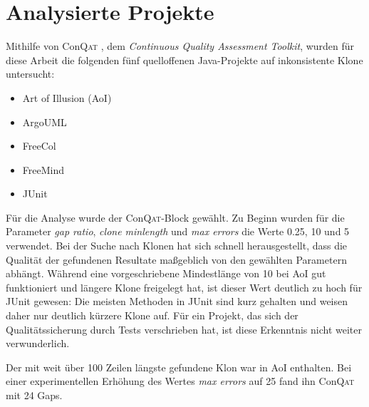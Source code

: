 \section{Analysierte Projekte}

Mithilfe von Con\textsc{Qat} \cite{deissenboeck2008tool}, dem \textit{Continuous Quality Assessment Toolkit}, wurden für diese Arbeit die folgenden fünf quelloffenen Java-Projekte auf inkonsistente Klone untersucht:

\begin{itemize}
  \item Art of Illusion (AoI)
  \item ArgoUML
  \item FreeCol
  \item FreeMind
  \item JUnit
\end{itemize}

Für die Analyse wurde der Con\textsc{Qat}-Block  gewählt. Zu Beginn wurden für die Parameter \textit{gap ratio}, \textit{clone minlength} und \textit{max errors} die Werte 0.25, 10 und 5 verwendet. Bei der Suche nach Klonen hat sich schnell herausgestellt, dass die Qualität der gefundenen Resultate maßgeblich von den gewählten Parametern abhängt. Während eine vorgeschriebene Mindestlänge von 10 bei AoI gut funktioniert und längere Klone freigelegt hat, ist dieser Wert deutlich zu hoch für JUnit gewesen: Die meisten Methoden in JUnit sind kurz gehalten und weisen daher nur deutlich kürzere Klone auf. Für ein Projekt, das sich der Qualitätssicherung durch Tests verschrieben hat, ist diese Erkenntnis nicht weiter verwunderlich.

Der mit weit über 100 Zeilen längste gefundene Klon war in AoI enthalten. Bei einer experimentellen Erhöhung des Wertes \textit{max errors} auf 25 fand ihn Con\textsc{Qat} mit 24 Gaps.
